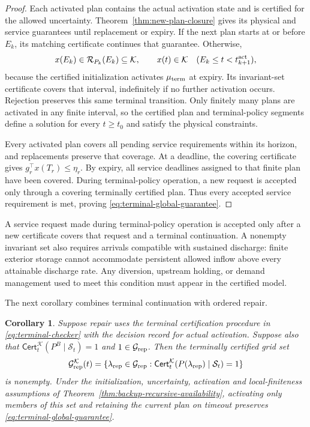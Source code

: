 \documentclass[preprint,12pt]{elsarticle}
\theoremstyle{definition}
\theoremstyle{plain}
\newtheorem{corollary}{Corollary}
\theoremstyle{definition}
\theoremstyle{plain}
\begin{document}
\begin{proof}
Each activated plan contains the actual activation state and is certified
for the allowed uncertainty. Theorem~\ref{thm:new-plan-closure} gives
its physical and service guarantees until replacement or expiry.
If the next plan starts at or before $E_k$, its matching certificate
continues that guarantee. Otherwise,
\[
 x(E_k)\in\mathcal R_{P_k}(E_k)\subseteq\mathcal K,
 \qquad x(t)\in\mathcal K\quad(E_k\le t<t_{k+1}^{\rm act}),
\]
because the certified initialization activates $\mu_{\rm term}$ at expiry.
Its invariant-set certificate covers that interval, indefinitely if
no further activation occurs. Rejection preserves this same terminal
transition. Only finitely many plans are activated in any finite
interval, so the certified plan and terminal-policy segments define
a solution for every $t\ge t_0$ and satisfy the physical constraints.

Every activated plan covers all pending service requirements
within its horizon, and replacements preserve that coverage. At a
deadline, the covering certificate gives $g_r^\top x(T_r)\le\eta_r$.
By expiry, all service deadlines assigned to that finite plan have been covered.
During terminal-policy operation, a new request is accepted only
through a covering terminally certified plan. Thus every accepted service
requirement is met, proving \eqref{eq:terminal-global-guarantee}.
\end{proof}

A service request made during terminal-policy operation is accepted
only after a new certificate covers that request and a terminal
continuation. A nonempty invariant set also requires arrivals compatible
with sustained discharge: finite exterior storage cannot accommodate
persistent allowed inflow above every attainable discharge rate. Any
diversion, upstream holding, or demand management used to meet this
condition must appear in the certified model.

The next corollary combines terminal continuation with ordered repair.

\begin{corollary}
\label{cor:repair-recursive}
Suppose repair uses the terminal certification procedure in
\eqref{eq:terminal-checker} with the decision record for actual
activation. Suppose also that
$\mathsf{Cert}^{\mathcal K}_t(P^B\mid\mathcal S_t)=1$ and
$1\in\mathcal G_{\rm rep}$. Then the terminally certified grid set
\begin{equation}
\mathcal G_{\rm rep}^{\mathcal K}(t)=
\{\lambda_{\rm rep}\in\mathcal G_{\rm rep}:
\mathsf{Cert}^{\mathcal K}_t(P(\lambda_{\rm rep})\mid\mathcal S_t)=1\}
\label{eq:repair-terminal-grid}
\end{equation}
is nonempty. Under the initialization, uncertainty, activation and
local-finiteness assumptions of
Theorem~\ref{thm:backup-recursive-availability}, activating only members
of this set and retaining the current plan on timeout preserves
\eqref{eq:terminal-global-guarantee}.
\end{corollary}
\end{document}
